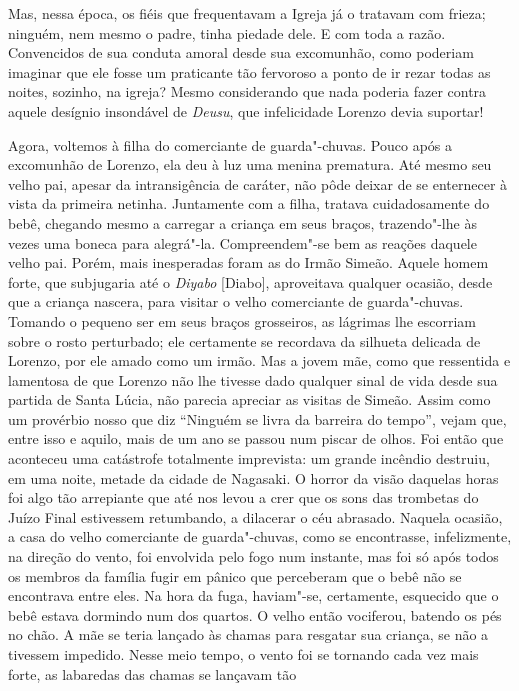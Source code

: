 Mas, nessa época, os fiéis que frequentavam a Igreja já o tratavam com
frieza; ninguém, nem mesmo o padre, tinha piedade dele. E com toda a
razão. Convencidos de sua conduta amoral desde sua excomunhão, como
poderiam imaginar que ele fosse um praticante tão fervoroso a ponto de
ir rezar todas as noites, sozinho, na igreja? Mesmo considerando que
nada poderia fazer contra aquele desígnio insondável de \textit{Deusu},
que infelicidade Lorenzo devia suportar!

Agora, voltemos à filha do comerciante de guarda"-chuvas. Pouco após a
excomunhão de Lorenzo, ela deu à luz uma menina prematura. Até mesmo
seu velho pai, apesar da intransigência de caráter, não pôde deixar de
se enternecer à vista da primeira netinha. Juntamente com a filha,
tratava cuidadosamente do bebê, chegando mesmo a carregar a criança em
seus braços, trazendo"-lhe às vezes uma boneca para alegrá"-la.
Compreendem"-se bem as reações daquele velho pai. Porém, mais inesperadas
foram as do Irmão Simeão. Aquele homem forte, que subjugaria até o
\textit{Diyabo} [Diabo], aproveitava qualquer ocasião, desde que a
criança nascera, para visitar o velho comerciante de guarda"-chuvas.
Tomando o pequeno ser em seus braços grosseiros, as lágrimas lhe
escorriam sobre o rosto perturbado; ele certamente se recordava da
silhueta delicada de Lorenzo, por ele amado como um irmão. Mas a jovem
mãe, como que ressentida e lamentosa de que Lorenzo não lhe tivesse
dado qualquer sinal de vida desde sua partida de Santa Lúcia, não
parecia apreciar as visitas de Simeão. Assim como um provérbio nosso
que diz ``Ninguém se livra da barreira do tempo'', vejam que, entre isso
e aquilo, mais de um ano se passou num piscar de olhos. Foi então que
aconteceu uma catástrofe totalmente imprevista: um grande incêndio
destruiu, em uma noite, metade da cidade de Nagasaki. O horror da visão
daquelas horas foi algo tão arrepiante que até nos levou a crer que os
sons das trombetas do Juízo Final estivessem retumbando, a dilacerar o
céu abrasado. Naquela ocasião, a casa do velho comerciante de
guarda"-chuvas, como se encontrasse, infelizmente, na direção do vento,
foi envolvida pelo fogo num instante, mas foi só após todos os membros
da família fugir em pânico que perceberam que o bebê não se encontrava
entre eles. Na hora da fuga, haviam"-se, certamente, esquecido que o
bebê estava dormindo num dos quartos. O velho então vociferou, batendo
os pés no chão. A mãe se teria lançado às chamas para resgatar sua
criança, se não a tivessem impedido. Nesse meio tempo, o vento foi se
tornando cada vez mais forte, as labaredas das chamas se lançavam tão
